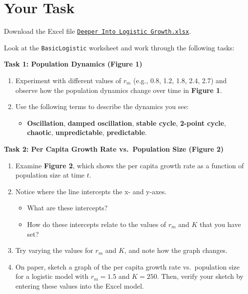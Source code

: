 \documentclass[
  a4paper]{book}
\providecommand{\tightlist}{%
  \setlength{\itemsep}{0pt}\setlength{\parskip}{0pt}}
\begin{document}
\section{Your Task}\label{your-task-6}

Download the Excel file \href{https://www.dropbox.com/s/4xq399z7skl1akv/Deeper\%20into\%20Logistic\%20Growth.xlsx?dl=1}{\texttt{Deeper\ Into\ Logistic\ Growth.xlsx}}.

Look at the \texttt{BasicLogistic} worksheet and work through the following tasks:

\textbf{Task 1: Population Dynamics (Figure 1)}

\begin{enumerate}
\def\labelenumi{\arabic{enumi}.}
\item
  Experiment with different values of \(r_m\) (e.g., 0.8, 1.2, 1.8, 2.4, 2.7) and observe how the population dynamics change over time in \textbf{Figure 1}.
\item
  Use the following terms to describe the dynamics you see:

  \begin{itemize}
  \tightlist
  \item
    \textbf{Oscillation}, \textbf{damped oscillation}, \textbf{stable cycle}, \textbf{2-point cycle}, \textbf{chaotic}, \textbf{unpredictable}, \textbf{predictable}.
  \end{itemize}
\end{enumerate}

\textbf{Task 2: Per Capita Growth Rate vs.~Population Size (Figure 2)}

\begin{enumerate}
\def\labelenumi{\arabic{enumi}.}
\item
  Examine \textbf{Figure 2}, which shows the per capita growth rate as a function of population size at time \(t\).
\item
  Notice where the line intercepts the x- and y-axes.

  \begin{itemize}
  \tightlist
  \item
    What are these intercepts?
  \item
    How do these intercepts relate to the values of \(r_m\) and \(K\) that you have set?
  \end{itemize}
\item
  Try varying the values for \(r_m\) and \(K\), and note how the graph changes.
\item
  On paper, sketch a graph of the per capita growth rate vs.~population size for a logistic model with \(r_m = 1.5\) and \(K = 250\). Then, verify your sketch by entering these values into the Excel model.
\end{enumerate}
\end{document}
